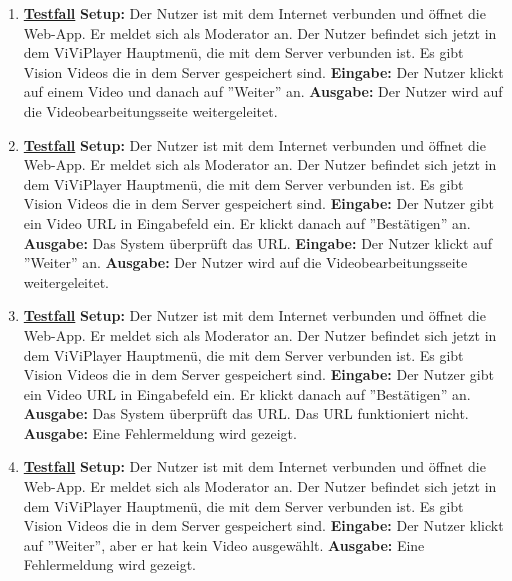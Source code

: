 \begin{enumerate}
	\item \underline{\textbf{Testfall}} \linebreak
	\textbf{Setup:} Der Nutzer ist mit dem Internet verbunden und öffnet die Web-App. Er meldet sich als Moderator an. Der Nutzer befindet sich jetzt in dem ViViPlayer Hauptmenü, die mit dem Server verbunden ist. Es gibt Vision Videos die in dem Server gespeichert sind.\linebreak
	\textbf{Eingabe:} Der Nutzer klickt auf einem Video und danach auf ''Weiter'' an. \linebreak
	\textbf{Ausgabe:} Der Nutzer wird auf die Videobearbeitungsseite weitergeleitet. 
	
	\item \underline{\textbf{Testfall}} \linebreak
	\textbf{Setup:} Der Nutzer ist mit dem Internet verbunden und öffnet die Web-App. Er meldet sich als Moderator an. Der Nutzer befindet sich jetzt in dem ViViPlayer Hauptmenü, die mit dem Server verbunden ist. Es gibt Vision Videos die in dem Server gespeichert sind.\linebreak
	\textbf{Eingabe:} Der Nutzer gibt ein Video URL in Eingabefeld ein. Er klickt danach auf ''Bestätigen'' an. \linebreak
	\textbf{Ausgabe:} Das System überprüft das URL. \linebreak
	\textbf{Eingabe:} Der Nutzer klickt auf ''Weiter'' an.\linebreak
	\textbf{Ausgabe:} Der Nutzer wird auf die Videobearbeitungsseite weitergeleitet.
	
	\item \underline{\textbf{Testfall}} \linebreak
	\textbf{Setup:} Der Nutzer ist mit dem Internet verbunden und öffnet die Web-App. Er meldet sich als Moderator an. Der Nutzer befindet sich jetzt in dem ViViPlayer Hauptmenü, die mit dem Server verbunden ist. Es gibt Vision Videos die in dem Server gespeichert sind.\linebreak
	\textbf{Eingabe:} Der Nutzer gibt ein Video URL in Eingabefeld ein. Er klickt danach auf ''Bestätigen'' an. \linebreak
	\textbf{Ausgabe:} Das System überprüft das URL. Das URL funktioniert nicht. \linebreak
	\textbf{Ausgabe:} Eine Fehlermeldung wird gezeigt.
	
	\item \underline{\textbf{Testfall}} \linebreak
	\textbf{Setup:} Der Nutzer ist mit dem Internet verbunden und öffnet die Web-App. Er meldet sich als Moderator an. Der Nutzer befindet sich jetzt in dem ViViPlayer Hauptmenü, die mit dem Server verbunden ist. Es gibt Vision Videos die in dem Server gespeichert sind.\linebreak
	\textbf{Eingabe:} Der Nutzer klickt auf ''Weiter'', aber er hat kein Video ausgewählt. \linebreak
	\textbf{Ausgabe:} Eine Fehlermeldung wird gezeigt.
	

\end{enumerate}
